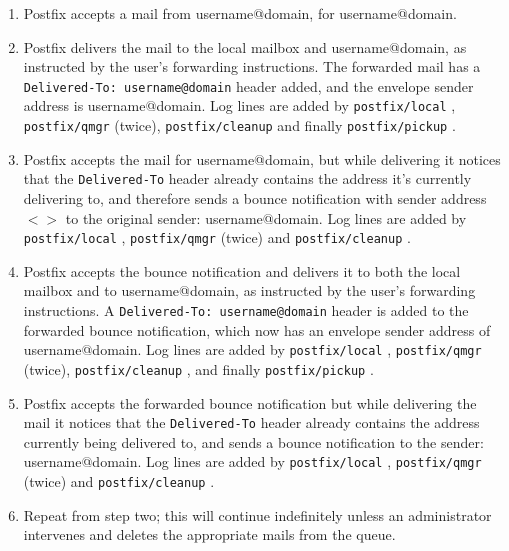 \documentclass[a4paper,12pt,draft]{article}
\newcommand{\daemon}[1]{%
    \texttt{postfix/#1}%
}
\begin{document}
\begin{enumerate}

    \item Postfix accepts a mail from username@domain, for username@domain.

    \item Postfix delivers the mail to the local mailbox and
        username@domain, as instructed by the user's forwarding
        instructions. The forwarded mail has a
        \texttt{Delivered-To:~username@domain} header added, and the
        envelope sender address is username@domain.  Log lines are added by
        \daemon{local}, \daemon{qmgr} (twice), \daemon{cleanup} and finally
        \daemon{pickup}.

    \item Postfix accepts the mail for username@domain, but while
        delivering it notices that the \texttt{Delivered-To} header already
        contains the address it's currently delivering to, and therefore
        sends a bounce notification with sender address \textit{$<>$\/} to
        the original sender: username@domain.  Log lines are added by
        \daemon{local}, \daemon{qmgr} (twice) and \daemon{cleanup}.

    \item Postfix accepts the bounce notification and delivers it to both
        the local mailbox and to username@domain, as instructed by the
        user's forwarding instructions.  A
        \texttt{Delivered-To:~username@domain} header is added to the
        forwarded bounce notification, which now has an envelope sender
        address of username@domain.  Log lines are added by \daemon{local},
        \daemon{qmgr} (twice), \daemon{cleanup}, and finally
        \daemon{pickup}.

    \item Postfix accepts the forwarded bounce notification but while
        delivering the mail it notices that the \texttt{Delivered-To}
        header already contains the address currently being delivered to,
        and sends a bounce notification to the sender: username@domain.
        Log lines are added by \daemon{local}, \daemon{qmgr} (twice) and
        \daemon{cleanup}.

    \item Repeat from step two; this will continue indefinitely unless an
        administrator intervenes and deletes the appropriate mails from the
        queue.

\end{enumerate}
\end{document}

